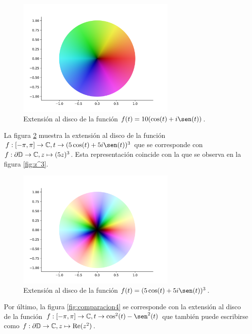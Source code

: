 \begin{figure}[!htbp]
    \centering
    \includegraphics[width=0.7\textwidth]{../Aplicacion/10cos(t)+10isen(t).png}
    \caption{Extensión al disco de la función $f(t) = 10(\cos(t) + i \sen(t))$.}
    \label{fig:comp_z}
\end{figure}

La figura \ref{fig:comp_z^3} muestra la extensión al disco de la función $f: [-\pi, \pi] \to \complex, t \to (5\cos(t)+5i \sen(t))^3$ que se corresponde con  $f: \partial \mathbb{D} \to \mathbb{C}, z \mapsto (5z)^3$. Esta representación coincide con la que se observa en la figura \ref{fig:z^3}. \\

\begin{figure}[!htbp]
    \centering
    \includegraphics[width=0.7\textwidth]{../Aplicacion/(5cos(t)+5isen(t))^3.png}
    \caption{Extensión al disco de la función $f(t) = (5\cos(t)+ 5i \sen(t))^3$.}
    \label{fig:comp_z^3}
\end{figure}

Por último, la figura \ref{fig:comparacion4} se corresponde con la extensión al disco de la función $f: [-\pi, \pi] \to \complex, t \to \cos^2(t)-\sen^2(t)$ que también puede escribirse como $f: \partial \mathbb{D} \to \mathbb{C}, z \mapsto \operatorname{Re}(z^2)$. \\

